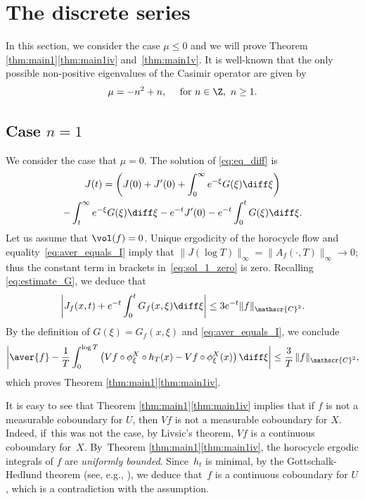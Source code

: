\section{The discrete series}\label{section:discrete_ser}

In this section, we consider the case $\mu \leq 0$ and we will prove Theorem \ref{thm:main1}\eqref{thm:main1iv} and~\eqref{thm:main1v}. It is well-known \cite{Bar} that the only possible non-positive eigenvalues of the Casimir operator are given by
\[
\mu = -n^2+n, \quad \text{ for }n \in \Z,\ n \geq 1.
\]

\subsection{Case $n=1$}
We consider the case that $\mu = 0$. The solution of \eqref{eq:eq_diff} is
\begin{multline}\label{eq:sol_1_zero}
J(t) = \biggl(J(0) + J'(0) + \int_0^\infty e^{-\xi}G(\xi) \diff \xi \biggr)\\
- \int_t^\infty e^{-\xi}G(\xi) \diff \xi - e^{-t} J'(0) - e^{-t}\int_0^t G(\xi) \diff \xi.
\end{multline}
Let us assume that $\vol(f)=0$. Unique ergodicity of the horocycle flow and equality~\eqref{eq:aver_equals_I} imply that $\|J(\log T) \|_\infty = \|A_f(\cdot, T) \|_\infty \to 0$; thus the constant term in brackets in~\eqref{eq:sol_1_zero} is zero.
Recalling \eqref{eq:estimate_G}, we deduce that
\[
\biggl\lvert J_f(x,t) + e^{-t}\int_0^t G_f(x,\xi) \diff \xi \biggr\rvert \leq 3 e^{-t} \|f\|_{\mathscr{C}^2}.
\]
By the definition of $G(\xi) = G_f(x,\xi)$ and \eqref{eq:aver_equals_I}, we conclude
\[
\biggl\lvert \aver{f} - \frac{1}{T} \int_0^{\log T} \left(Vf \circ \phi^X_\xi \circ h_T(x) - Vf\circ \phi^X_\xi (x) \right) \diff \xi \biggr\rvert \leq \frac{3}{T}\, \|f\|_{\mathscr{C}^2},
\]
which proves Theorem \ref{thm:main1}\eqref{thm:main1iv}.

\begin{remark}\label{remark:Vf_cob}
It is easy to see that Theorem \ref{thm:main1}\eqref{thm:main1iv} implies that if $f$ is not a measurable coboundary for $U$, then $Vf$ is not a measurable coboundary for $X$. Indeed, if~this was not the case, by Livsic's theorem, $Vf$ is a continuous coboundary for~$X$. By~Theorem \ref{thm:main1}\eqref{thm:main1iv}, the horocycle ergodic integrals of $f$ are \emph{uniformly bounded}. Since~$h_t$ is minimal, by the Gottschalk-Hedlund theorem (see, e.g., \cite[Th.\,C]{McC}), we deduce that~$f$ is a continuous coboundary for $U$, which is a contradiction with the assumption.
\end{remark}

